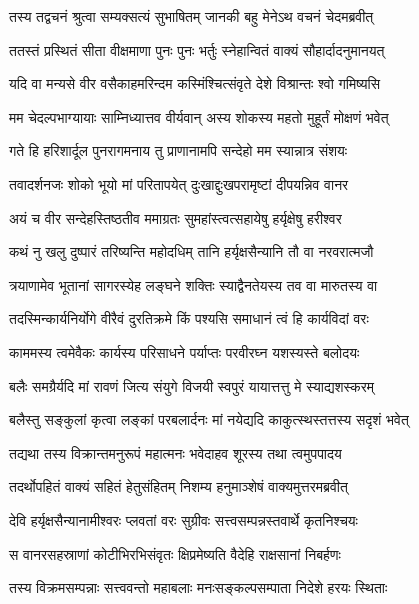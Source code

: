 \twolineshloka
{तस्य तद्वचनं श्रुत्वा सम्यक्सत्यं सुभाषितम्}
{जानकी बहु मेनेऽथ वचनं चेदमब्रवीत्} %

\twolineshloka
{ततस्तं प्रस्थितं सीता वीक्षमाणा पुनः पुनः}
{भर्तुः स्नेहान्वितं वाक्यं सौहार्दादनुमानयत्} %

\twolineshloka
{यदि वा मन्यसे वीर वसैकाहमरिन्दम}
{कस्मिंश्चित्संवृते देशे विश्रान्तः श्वो गमिष्यसि} %

\twolineshloka
{मम चेदल्पभाग्यायाः साम्निध्यात्तव वीर्यवान्}
{अस्य शोकस्य महतो मुहूर्तं मोक्षणं भवेत्} %

\twolineshloka
{गते हि हरिशार्दूल पुनरागमनाय तु}
{प्राणानामपि सन्देहो मम स्यान्नात्र संशयः} %

\twolineshloka
{तवादर्शनजः शोको भूयो मां परितापयेत्}
{दुःखाद्दुःखपरामृष्टां दीपयन्निव वानर} %

\twolineshloka
{अयं च वीर सन्देहस्तिष्ठतीव ममाग्रतः}
{सुमहांस्त्वत्सहायेषु हर्यृक्षेषु हरीश्वर} %

\twolineshloka
{कथं नु खलु दुष्पारं तरिष्यन्ति महोदधिम्}
{तानि हर्यृक्षसैन्यानि तौ वा नरवरात्मजौ} %

\twolineshloka
{त्रयाणामेव भूतानां सागरस्येह लङ्घने}
{शक्तिः स्याद्वैनतेयस्य तव वा मारुतस्य वा} %

\twolineshloka
{तदस्मिन्कार्यनिर्योगे वीरैवं दुरतिक्रमे}
{किं पश्यसि समाधानं त्वं हि कार्यविदां वरः} %

\twolineshloka
{काममस्य त्वमेवैकः कार्यस्य परिसाधने}
{पर्याप्तः परवीरघ्न यशस्यस्ते बलोदयः} %

\twolineshloka
{बलैः समग्रैर्यदि मां रावणं जित्य संयुगे}
{विजयी स्वपुरं यायात्तत्तु मे स्याद्यशस्करम्} %

\twolineshloka
{बलैस्तु सङ्कुलां कृत्वा लङ्कां परबलार्दनः}
{मां नयेद्यदि काकुत्स्थस्तत्तस्य सदृशं भवेत्} %

\twolineshloka
{तद्यथा तस्य विक्रान्तमनुरूपं महात्मनः}
{भवेदाहव शूरस्य तथा त्वमुपपादय} %

\twolineshloka
{तदर्थोपहितं वाक्यं सहितं हेतुसंहितम्}
{निशम्य हनुमाञ्शेषं वाक्यमुत्तरमब्रवीत्} %

\twolineshloka
{देवि हर्यृक्षसैन्यानामीश्वरः प्लवतां वरः}
{सुग्रीवः सत्त्वसम्पन्नस्तवार्थे कृतनिश्चयः} %

\twolineshloka
{स वानरसहस्राणां कोटीभिरभिसंवृतः}
{क्षिप्रमेष्यति वैदेहि राक्षसानां निबर्हणः} %

\twolineshloka
{तस्य विक्रमसम्पन्नाः सत्त्ववन्तो महाबलाः}
{मनःसङ्कल्पसम्पाता निदेशे हरयः स्थिताः} %

